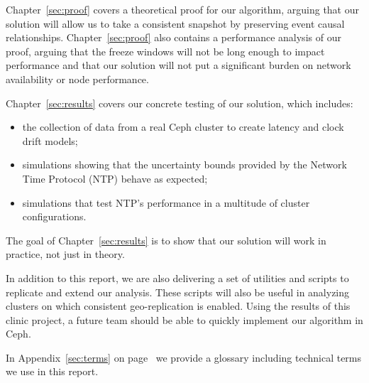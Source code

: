 Chapter~\ref{sec:proof} covers a theoretical proof for our algorithm, arguing
that our solution will allow us to take a consistent snapshot by preserving 
event causal relationships. Chapter~\ref{sec:proof} also contains a 
performance analysis of our proof, arguing that the freeze windows will not be 
long enough to impact performance and that our solution will not put a 
significant burden on network availability or node performance. 

Chapter~\ref{sec:results} covers our concrete testing of our solution, which
includes:
\begin{itemize}
\item the collection of data from a real Ceph cluster to create latency and
clock drift models;
\item simulations showing that the uncertainty bounds provided by the Network 
Time Protocol (NTP) behave as expected;
\item simulations that test NTP's performance in a multitude of cluster
configurations.
\end{itemize}
The goal of Chapter~\ref{sec:results} is to show that our solution will work
in practice, not just in theory.



In addition to this report, we are also delivering a set of utilities
and scripts to replicate and extend our analysis. These scripts will
also be useful in analyzing clusters on which consistent
geo-replication is enabled. Using the results of this clinic project,
a future team should be able to quickly implement our algorithm in
Ceph.

In Appendix~\ref{sec:terms} on page~\pageref{sec:terms} we provide
a glossary including technical terms we use in this report.


